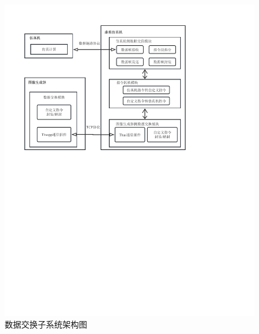 \begin{figure}[htbp]
    \begin{center}
        \includegraphics[width=\textwidth]{pictures/framework.pdf}
        \caption{数据交换子系统架构图}
        \label{subframe}
    \end{center}
\end{figure}
